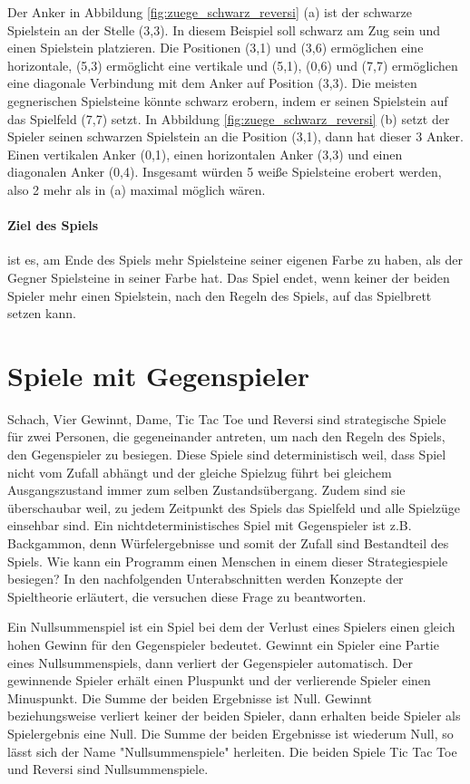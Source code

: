 Der Anker in Abbildung \ref{fig:zuege_schwarz_reversi} (a) ist der schwarze Spielstein an der Stelle (3,3). In diesem Beispiel soll schwarz am Zug sein und einen Spielstein platzieren. Die Positionen (3,1) und (3,6) ermöglichen eine horizontale, (5,3) ermöglicht eine vertikale und (5,1), (0,6) und (7,7) ermöglichen eine diagonale Verbindung mit dem Anker auf Position (3,3). Die meisten gegnerischen Spielsteine könnte schwarz erobern, indem er seinen Spielstein auf das Spielfeld (7,7) setzt. In Abbildung \ref{fig:zuege_schwarz_reversi} (b) setzt der Spieler seinen schwarzen Spielstein an die Position (3,1), dann hat dieser 3 Anker. Einen vertikalen Anker (0,1), einen horizontalen Anker (3,3) und einen diagonalen Anker (0,4). Insgesamt würden 5 weiße Spielsteine erobert werden, also 2 mehr als in (a) maximal möglich wären. \\

\paragraph{Ziel des Spiels} ist es, am Ende des Spiels mehr Spielsteine seiner eigenen Farbe zu haben, als der Gegner Spielsteine in seiner Farbe hat. Das Spiel endet, wenn keiner der beiden Spieler mehr einen Spielstein, nach den Regeln des Spiels, auf das Spielbrett setzen kann. \\

\section{Spiele mit Gegenspieler}
\label{sec:Spiele mit Gegner}
Schach, Vier Gewinnt, Dame, Tic Tac Toe und Reversi sind strategische Spiele für zwei Personen, die gegeneinander antreten, um nach den Regeln des Spiels, den Gegenspieler zu besiegen. Diese Spiele sind deterministisch weil, dass Spiel nicht vom Zufall abhängt und der gleiche Spielzug führt bei gleichem Ausgangszustand immer zum selben Zustandsübergang. Zudem sind sie überschaubar weil, zu jedem Zeitpunkt des Spiels das Spielfeld und alle Spielzüge einsehbar sind. Ein nichtdeterministisches Spiel mit Gegenspieler ist z.B. Backgammon, denn Würfelergebnisse und somit der Zufall sind Bestandteil des Spiels. Wie kann ein Programm einen Menschen in einem dieser Strategiespiele besiegen? In den nachfolgenden Unterabschnitten werden Konzepte der Spieltheorie erläutert, die versuchen diese Frage zu beantworten.

Ein Nullsummenspiel ist ein Spiel bei dem der Verlust eines Spielers einen gleich hohen Gewinn für den Gegenspieler bedeutet. Gewinnt ein Spieler eine Partie eines Nullsummenspiels, dann verliert der Gegenspieler automatisch. Der gewinnende Spieler erhält einen Pluspunkt und der verlierende Spieler einen Minuspunkt. Die Summe der beiden Ergebnisse ist Null. Gewinnt beziehungsweise verliert keiner der beiden Spieler, dann erhalten beide Spieler als Spielergebnis eine Null. Die Summe der beiden Ergebnisse ist wiederum Null, so lässt sich der Name "Nullsummenspiele" herleiten. Die beiden Spiele Tic Tac Toe und Reversi sind Nullsummenspiele. 

